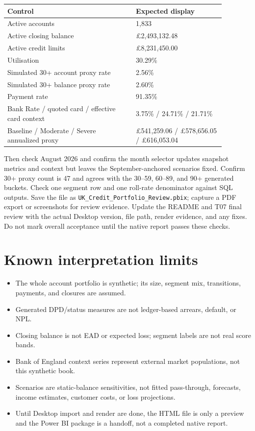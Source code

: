 \documentclass[11pt]{article}
\begin{document}
\begin{longtable}{p{0.52\linewidth}p{0.36\linewidth}}
\toprule
\textbf{Control} & \textbf{Expected display} \\
\midrule
\endhead
Active accounts & 1,833 \\
Active closing balance & £2,493,132.48 \\
Active credit limits & £8,231,450.00 \\
Utilisation & 30.29\% \\
Simulated 30+ account proxy rate & 2.56\% \\
Simulated 30+ balance proxy rate & 2.60\% \\
Payment rate & 91.35\% \\
Bank Rate / quoted card / effective card context & 3.75\% / 24.71\% / 21.71\% \\
Baseline / Moderate / Severe annualized proxy & £541,259.06 / £578,656.05 / £616,053.04 \\
\bottomrule
\end{longtable}

Then check August 2026 and confirm the month selector updates snapshot metrics and context but leaves the September-anchored scenarios fixed. Confirm 30+ proxy count is 47 and agrees with the 30--59, 60--89, and 90+ generated buckets. Check one segment row and one roll-rate denominator against SQL outputs. Save the file as \texttt{UK\_Credit\_Portfolio\_Review.pbix}; capture a PDF export or screenshots for review evidence. Update the README and T07 final review with the actual Desktop version, file path, render evidence, and any fixes. Do not mark overall acceptance until the native report passes these checks.

\section{Known interpretation limits}

\begin{itemize}
\item The whole account portfolio is synthetic; its size, segment mix, transitions, payments, and closures are assumed.
\item Generated DPD/status measures are not ledger-based arrears, default, or NPL.
\item Closing balance is not EAD or expected loss; segment labels are not real score bands.
\item Bank of England context series represent external market populations, not this synthetic book.
\item Scenarios are static-balance sensitivities, not fitted pass-through, forecasts, income estimates, customer costs, or loss projections.
\item Until Desktop import and render are done, the HTML file is only a preview and the Power BI package is a handoff, not a completed native report.
\end{itemize}
\end{document}
